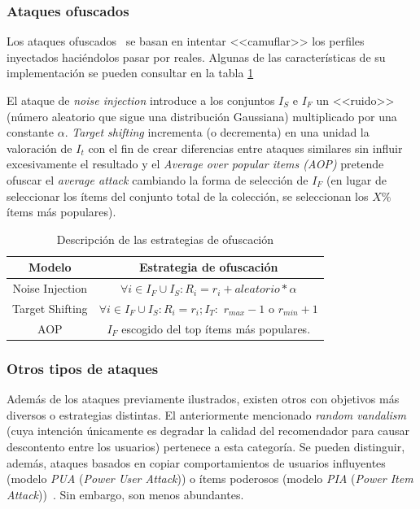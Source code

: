 \subsubsection{Ataques ofuscados}

Los ataques ofuscados~\cite{mingdan2018ShillingAttacksAReview} se basan en intentar <<camuflar>> los perfiles inyectados haciéndolos pasar por reales. Algunas de las características de su implementación se pueden consultar en la tabla \ref{tabla_descripcion_estrategias_ofuscación}

El ataque de \textit{noise injection} introduce a los conjuntos $I_S$ e $I_F$ un <<ruido>> (número aleatorio que sigue una distribución Gaussiana) multiplicado por una constante $\alpha$. \textit{Target shifting} incrementa (o decrementa) en una unidad la valoración de $I_t$ con el fin de crear diferencias entre ataques similares sin influir excesivamente el resultado y el \textit{Average over popular items (AOP)} pretende ofuscar el \textit{average attack} cambiando la forma de selección de $I_F$ (en lugar de seleccionar los ítems del conjunto total de la colección, se seleccionan los $X\%$ ítems más populares).

\begin{table}\centering
	\resizebox{12cm}{!} {
		\begin{tabular}{c c}\toprule
			
			Modelo & Estrategia de ofuscación\\ \midrule
			
			Noise Injection & $\forall i \in I_F \cup I_S: R_i = r_i + aleatorio * \alpha $\\
			Target Shifting & $\forall i \in I_F \cup I_S: R_i = r_i; I_T:$ $r_{max}-1$ o $r_{min}+1$ \\
			AOP & $I_F$ escogido del top ítems más populares.\\
			\bottomrule
		\end{tabular}
	}
	
	\caption{Descripción de las estrategias de ofuscación}
	\label{tabla_descripcion_estrategias_ofuscación}
	
\end{table}

\subsubsection{Otros tipos de ataques}

Además de los ataques previamente ilustrados, existen otros con objetivos más diversos o estrategias distintas. El anteriormente mencionado \textit{random vandalism} (cuya intención únicamente es degradar la calidad del recomendador para causar descontento entre los usuarios) pertenece a esta categoría. Se pueden distinguir, además, ataques basados en copiar comportamientos de usuarios influyentes (modelo \textit{PUA} (\textit{Power User Attack})) o ítems poderosos (modelo \textit{PIA} (\textit{Power Item Attack}))~\cite{mingdan2018ShillingAttacksAReview}. Sin embargo, son menos abundantes.


